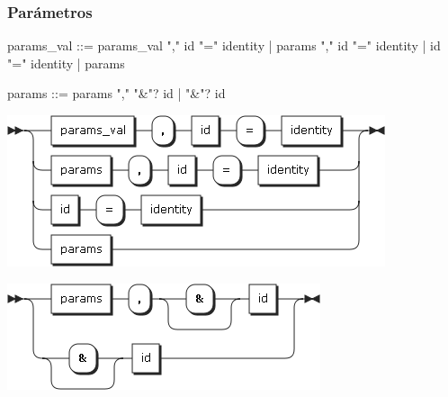 \subsubsection{Parámetros}
\begin{myverbatim}
params_val ::= params_val "," id "=" identity 
   |  params "," id "=" identity 
   |  id "=" identity 
   |  params
   
params ::= params "," "&"? id
   |  "&"? id
\end{myverbatim}
\begin{multicols}{2}
\begin{center}
\includegraphics[scale=0.4]{diagram/params_val.png} \\
\end{center}
\columnbreak
\begin{center}
\includegraphics[scale=0.4]{diagram/params.png} \\
\end{center}
\end{multicols}

